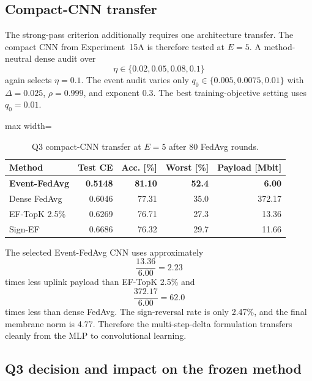 \subsection{Compact-CNN transfer}

The strong-pass criterion additionally requires one architecture transfer. The compact CNN from Experiment~15A is therefore tested at $E=5$. A method-neutral dense audit over
\begin{equation}
    \eta\in\{0.02,0.05,0.08,0.1\}
\end{equation}
again selects $\eta=0.1$. The event audit varies only $q_0\in\{0.005,0.0075,0.01\}$ with $\Delta=0.025$, $\rho=0.999$, and exponent $0.3$. The best training-objective setting uses $q_0=0.01$.

\begin{table}[ht]
\centering
\small
\caption{Q3 compact-CNN transfer at $E=5$ after 80 FedAvg rounds.}
\label{tab:q3-cnn}
\begin{adjustbox}{max width=\textwidth}
\begin{tabular}{lrrrr}
\toprule
Method & Test CE & Acc. [\%] & Worst [\%] & Payload [Mbit]\\
\midrule
\textbf{Event-FedAvg} & \textbf{0.5148} & \textbf{81.10} & \textbf{52.4} & \textbf{6.00}\\
Dense FedAvg & 0.6046 & 77.31 & 35.0 & 372.17\\
EF-TopK 2.5\% & 0.6269 & 76.71 & 27.3 & 13.36\\
Sign-EF & 0.6686 & 76.32 & 29.7 & 11.66\\
\bottomrule
\end{tabular}
\end{adjustbox}
\end{table}

The selected Event-FedAvg CNN uses approximately
\begin{equation}
    \frac{13.36}{6.00}=2.23
\end{equation}
times less uplink payload than EF-TopK 2.5\% and
\begin{equation}
    \frac{372.17}{6.00}=62.0
\end{equation}
times less than dense FedAvg. The sign-reversal rate is only 2.47\%, and the final membrane norm is 4.77. Therefore the multi-step-delta formulation transfers cleanly from the MLP to convolutional learning.

\subsection{Q3 decision and impact on the frozen method}

